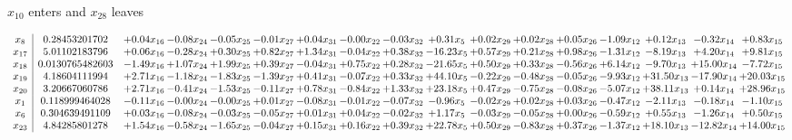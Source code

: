 \documentclass[9pt]{article}
\begin{document}
 $ x_{10} $ enters and $ x_{28} $ leaves 

 \[\begin{array}{c| c c@{\hskip 2pt} c@{\hskip 2pt} c@{\hskip 2pt} c@{\hskip 2pt} c@{\hskip 2pt} c@{\hskip 2pt} c@{\hskip 2pt} c@{\hskip 2pt} c@{\hskip 2pt} c@{\hskip 2pt} c@{\hskip 2pt} c@{\hskip 2pt} c@{\hskip 2pt} c@{\hskip 2pt} c@{\hskip 2pt} }
 x_{8}   &  0.28453201702 & +  0.04 x_{16} & -0.08 x_{24} & -0.05 x_{25} & -0.01 x_{27} & +  0.04 x_{31} & -0.00 x_{22} & -0.03 x_{32} & +  0.31 x_{5} & +  0.02 x_{29} & +  0.02 x_{28} & +  0.05 x_{26} & -1.09 x_{12} & +  0.12 x_{13} & -0.32 x_{14} & +  0.83 x_{15}\\
 x_{17}   &  5.01102183796 & +  0.06 x_{16} & -0.28 x_{24} & +  0.30 x_{25} & +  0.82 x_{27} & +  1.34 x_{31} & -0.04 x_{22} & +  0.38 x_{32} & -16.23 x_{5} & +  0.57 x_{29} & +  0.21 x_{28} & +  0.98 x_{26} & -1.31 x_{12} & -8.19 x_{13} & +  4.20 x_{14} & +  9.81 x_{15}\\
 x_{18}   &  0.0130765482603 & -1.49 x_{16} & +  1.07 x_{24} & +  1.99 x_{25} & +  0.39 x_{27} & -0.04 x_{31} & +  0.75 x_{22} & +  0.28 x_{32} & -21.65 x_{5} & +  0.50 x_{29} & +  0.33 x_{28} & -0.56 x_{26} & +  6.14 x_{12} & -9.70 x_{13} & + 15.00 x_{14} & -7.72 x_{15}\\
 x_{19}   &  4.18604111994 & +  2.71 x_{16} & -1.18 x_{24} & -1.83 x_{25} & -1.39 x_{27} & +  0.41 x_{31} & -0.07 x_{22} & +  0.33 x_{32} & + 44.10 x_{5} & -0.22 x_{29} & -0.48 x_{28} & -0.05 x_{26} & -9.93 x_{12} & + 31.50 x_{13} & -17.90 x_{14} & + 20.03 x_{15}\\
 x_{20}   &  3.20667060786 & +  2.71 x_{16} & -0.41 x_{24} & -1.53 x_{25} & -0.11 x_{27} & +  0.78 x_{31} & -0.84 x_{22} & +  1.33 x_{32} & + 23.18 x_{5} & +  0.47 x_{29} & -0.75 x_{28} & -0.08 x_{26} & -5.07 x_{12} & + 38.11 x_{13} & +  0.14 x_{14} & + 28.96 x_{15}\\
 x_{1}   &  0.118999464028 & -0.11 x_{16} & -0.00 x_{24} & -0.00 x_{25} & +  0.01 x_{27} & -0.08 x_{31} & -0.01 x_{22} & -0.07 x_{32} & -0.96 x_{5} & -0.02 x_{29} & +  0.02 x_{28} & +  0.03 x_{26} & -0.47 x_{12} & -2.11 x_{13} & -0.18 x_{14} & -1.10 x_{15}\\
 x_{6}   &  0.304639491109 & +  0.03 x_{16} & -0.08 x_{24} & -0.03 x_{25} & -0.05 x_{27} & +  0.01 x_{31} & +  0.04 x_{22} & -0.02 x_{32} & +  1.17 x_{5} & -0.03 x_{29} & -0.05 x_{28} & +  0.00 x_{26} & -0.59 x_{12} & +  0.55 x_{13} & -1.26 x_{14} & +  0.50 x_{15}\\
 x_{23}   &  4.84285801278 & +  1.54 x_{16} & -0.58 x_{24} & -1.65 x_{25} & -0.04 x_{27} & +  0.15 x_{31} & +  0.16 x_{22} & +  0.39 x_{32} & + 22.78 x_{5} & +  0.50 x_{29} & -0.83 x_{28} & +  0.37 x_{26} & -1.37 x_{12} & + 18.10 x_{13} & -12.82 x_{14} & + 14.00 x_{15}\\

\end{array}\]
\end{document}
